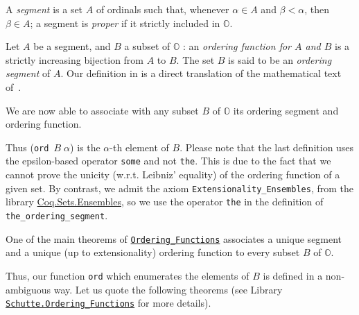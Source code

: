 {A \emph{segment} is a set $A$ of ordinals such that, whenever  $\alpha\in A$ and
$\beta<\alpha$, then $\beta\in A$; a segment is  \emph{proper} if it strictly included in $\mathbb{O}$.




Let  $A$ be a segment, and $B$ a subset of $\mathbb{O}$ : an \emph{ordering function for $A$ and  $B$} is a strictly increasing bijection from $A$ to $B$.
The set $B$ is said to be an \emph{ordering segment} of $A$.
Our definition in \coq{} is a direct translation of the mathematical text of~\cite{schutte}.




We are now able to associate with any subset $B$ of $\mathbb{O}$ its ordering segment and ordering function.




Thus (\texttt{ord $B \;\alpha$}) is the $\alpha$-th element of $B$.
Please note that the last definition uses the epsilon-based operator \texttt{some} and
not \texttt{the}. This is due to the fact that we cannot prove the unicity (w.r.t. Leibniz' equality) of the ordering function of a given set. 
By contrast, we admit the axiom  \texttt{Extensionality\_Ensembles}, from the library 
\href{https://coq.inria.fr/distrib/current/stdlib/Coq.Sets.Ensembles.html}{Coq.Sets.Ensembles}, so we use the operator \texttt{the} in the definition of
\texttt{the\_ordering\_segment}.

One of the main theorems of
\href{../theories/html/hydras.Schutte.Ordering_Functions.html\#ordering_function_ex}%
{\texttt{Ordering\_Functions}} 
associates a unique segment and a unique (up to extensionality) ordering function to every subset $B$ of $\mathbb{O}$.



Thus,  our function \texttt{ord}  which enumerates the elements of $B$ is defined in a non-ambiguous way.
Let us quote the following theorems (see Library
\href{../theories/html/hydras.Schutte.Ordering_Functions.html}%
{\texttt{Schutte.Ordering\_Functions}} for more details).
 




}

